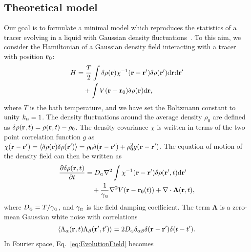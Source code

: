 \documentclass[pre, superscriptaddress, twocolumn,pre]{revtex4-1}
\newcommand{\dd}{\text{d}}
\begin{document}
\subsection{Theoretical model}

Our goal is to formulate a minimal model which reproduces the statistics of a tracer evolving in a liquid with Gaussian density fluctuations~\cite{Chandler1993}. To this aim, we consider the Hamiltonian of a Gaussian density field interacting with a tracer with position ${\bf r}_0$:
\begin{equation}
	\begin{aligned}
		H &= \frac{T}{2} \int \delta \rho ({\bf r}) \chi^{-1}({\bf r} - {\bf r}') \delta \rho ({\bf r}') \dd{\bf r}\dd{\bf r}'
		\\
		&\quad + \int V({\bf r}-{\bf r}_0) \delta \rho({\bf r}) \dd{\bf r} ,
	\end{aligned}
\end{equation}
where $T$ is the bath temperature, and we have set the Boltzmann constant to unity $k_\text{\tiny B}=1$. The density fluctuations around the average density $\rho_0$ are defined as $\delta \rho({\bf r},t ) = \rho({\bf r}, t) - \rho_0 $. The density covariance $\chi$ is written in terms of the two point correlation function $g$ as $\chi({\bf r}-{\bf r}')= \langle \delta \rho({\bf r}) \delta \rho ({\bf r}') \rangle=  \rho_0 \delta({\bf r} - {\bf r}') +\rho_0^2 g({\bf r}-{\bf r}')$. The equation of motion of the density field can then be written as
\begin{equation}\label{eq:EvolutionField}
	\begin{aligned}
		\frac{\partial \delta \rho({\bf r}, t)}{\partial t} &= D_\text{\tiny G} \nabla^2 \int \chi^{-1} ({\bf r}-{\bf r}') \delta \rho({\bf r}', t) \dd{\bf r}'
		\\
		&\quad + \frac{1}{\gamma_\text{\tiny G}} \nabla^2 V({\bf r}-{\bf r}_0(t)) + \nabla \cdot {\boldsymbol\Lambda}({\bf r},t) ,
	\end{aligned}
\end{equation}
where $D_\text{\tiny G} = T/\gamma_\text{\tiny G}$, and $\gamma_\text{\tiny G}$ is the field damping coefficient. The term $\boldsymbol\Lambda$ is a zero-mean Gaussian white noise with correlations
\begin{equation}
	\langle \Lambda_\alpha({\bf r}, t) \Lambda_\beta({\bf r}', t') \rangle = 2 D_\text{\tiny G} \delta_{\alpha\beta}\delta({\bf r} - {\bf r}')\delta(t-t') .
\end{equation}
In Fourier space, Eq.~\eqref{eq:EvolutionField} becomes
\end{document}

